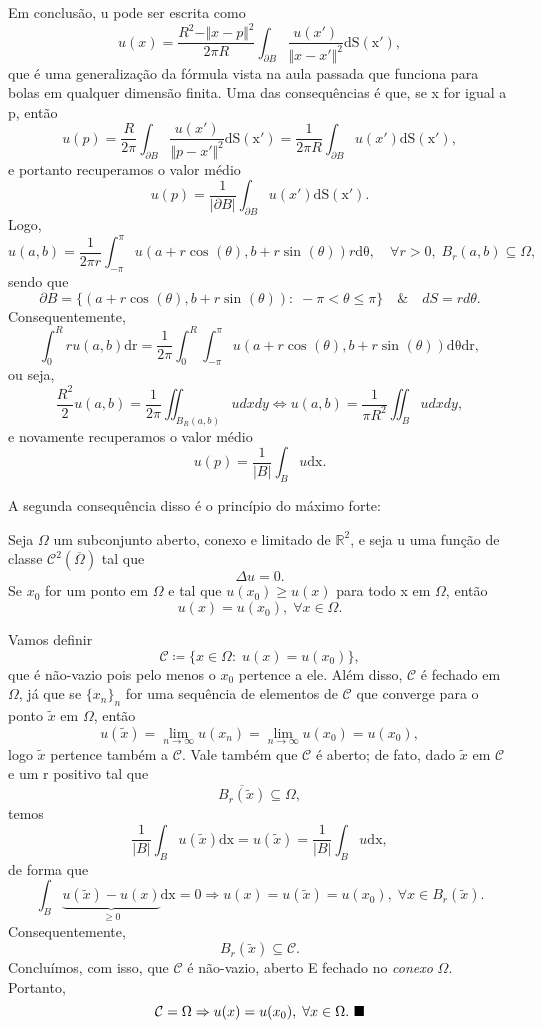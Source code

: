\documentclass[../pde_notes.tex]{subfiles}
\begin{document}
Em conclusão, u pode ser escrita como
\[
	u(x) = \frac{R^{2}-\Vert x-p \Vert^{2}}{2\pi R}\int_{\partial B}^{}\frac{u(x')}{\Vert x-x' \Vert^{2}} \mathrm{dS(x')},
\]
que é uma generalização da fórmula vista na aula passada que funciona para bolas em qualquer dimensão finita. Uma das consequências é que, se x for igual a p, então
\[
	u(p) = \frac{R}{2\pi }\int_{\partial B}^{}\frac{u(x')}{\Vert p-x' \Vert^{2}} \mathrm{dS(x')} = \frac{1}{2\pi R}\int_{\partial B}^{}u(x') \mathrm{dS(x')},
\]
e portanto recuperamos o valor médio
\[
	u(p) = \frac{1}{|\partial B|}\int_{\partial B}^{}u(x') \mathrm{dS(x')}.
\]
Logo,
\[
	u(a, b) = \frac{1}{2\pi r}\int_{-\pi }^{\pi }u(a+r\cos^{}{(\theta )}, b+r\sin^{}{(\theta )})r \mathrm{d\theta },\quad \forall r > 0,\; B_r(a, b)\subseteq \Omega,
\]
sendo que
\[
	\partial B = \{(a+r\cos^{}{(\theta )}, b+r\sin^{}{(\theta )}):\; -\pi <\theta \leq \pi \}\quad\&\quad  dS = rd\theta.
\]
Consequentemente,
\[
	\int_{0}^{R}ru(a, b) \mathrm{dr} = \frac{1}{2\pi }\int_{0}^{R}\int_{-\pi }^{\pi }u(a+r\cos^{}{(\theta )}, b+r\sin^{}{(\theta )}) \mathrm{d\theta } \mathrm{dr},
\]
ou seja,
\[
	\frac{R^{2}}{2}u(a, b) = \frac{1}{2\pi } \iint_{B_{R}(a, b)}udxdy \Longleftrightarrow u(a, b) = \frac{1}{\pi R^{2}}\iint_{B}udxdy,
\]
e novamente recuperamos o valor médio
\[
	u(p) = \frac{1}{|B|}\int_{B}^{}u \mathrm{dx}.
\]

A segunda consequência disso é o princípio do máximo forte:
\begin{theorem*}
	Seja \(\Omega \) um subconjunto aberto, conexo e limitado de \(\mathbb{R}^{2}\), e seja u uma função de classe \(\mathcal{C}^{2}(\overline{\Omega })\) tal que
	\[
		\Delta u = 0.
	\]
	Se \(x_{0}\) for um ponto em \(\Omega \) e tal que \(u(x_{0}) \geq u(x)\) para todo x em \(\Omega \), então
	\[
		u(x) = u(x_{0}),\; \forall x\in \Omega .
	\]
\end{theorem*}
\begin{proof*}
	Vamos definir
	\[
		\mathcal{C}\coloneqq \{x\in \Omega :\; u(x) = u(x_{0})\},
	\]
	que é não-vazio pois pelo menos o \(x_{0}\) pertence a ele. Além disso, \(\mathcal{C}\) é fechado em \(\Omega \), já que se \(\{x_{n}\}_{n}\) for uma sequência de elementos de \(\mathcal{C}\) que converge para o ponto \(\tilde{x}\) em \(\Omega \), então
	\[
		u(\tilde{x}) = \lim_{n\to \infty}u(x_{n}) = \lim_{n\to \infty}u(x_{0}) = u(x_{0}),
	\]
	logo \(\tilde{x}\) pertence também a \(\mathcal{C}.\) Vale também que \(\mathcal{C}\) é aberto; de fato, dado \(\tilde{x}\) em \(\mathcal{C}\) e um r positivo tal que
	\[
		\overline{B_r(\tilde{x})}\subseteq \Omega ,
	\]
	temos
	\[
		\frac{1}{|B|}\int_{B}^{}u(\tilde{x}) \mathrm{dx} = u(\tilde{x}) = \frac{1}{|B|}\int_{B}^{}u \mathrm{dx},
	\]
	de forma que
	\[
		\int_{B}^{}\underbrace{u(\tilde{x})-u(x)}_{\geq 0} \mathrm{dx} = 0 \Rightarrow u(x) = u(\tilde{x}) = u(x_{0}),\; \forall x\in B_r(\tilde{x}).
	\]
	Consequentemente,
	\[
		B_r(\tilde{x})\subseteq \mathcal{C}.
	\]
	Concluímos, com isso, que \(\mathcal{C}\) é não-vazio, aberto E fechado no \textit{conexo} \(\Omega \). Portanto,
	\[
		\mathcal{C}=\Omega  \Rightarrow u(x) = u(x_{0}),\; \forall x\in \Omega . \text{ $\blacksquare$}
	\]
\end{proof*}
\end{document}
